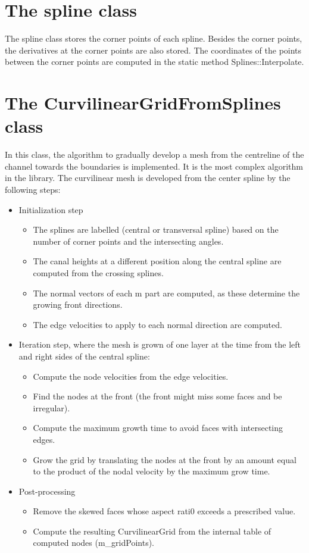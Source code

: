 \documentclass[biblatex]{deltares_manual}
\begin{document}
\chapter{The spline class}

The spline class stores the corner points of each spline. Besides the corner points, the derivatives at the corner points are also stored. The coordinates of the points between the corner points are computed in the static method Splines::Interpolate.
\chapter{The CurvilinearGridFromSplines class}

In this class, the algorithm to gradually develop a mesh from the centreline of the channel towards the boundaries is implemented. It is the most complex algorithm in the library. The curvilinear mesh is developed from the center spline by the following steps:
\begin{itemize}
\item Initialization step
\begin{itemize}
\item The splines are labelled (central or transversal spline) based on the number of corner points and the intersecting angles.
\item The canal heights at a different position along the central spline are computed from the crossing splines.
\item The normal vectors of each m part are computed, as these determine the growing front directions.
\item The edge velocities to apply to each normal direction are computed.
\end{itemize}
\item Iteration step, where the mesh is grown of one layer at the time from the left and right sides of the central spline:
\begin{itemize}
\item Compute the node velocities from the edge velocities.
\item Find the nodes at the front (the front might miss some faces and be irregular).
\item Compute the maximum growth time to avoid faces with intersecting edges.
\item Grow the grid by translating the nodes at the front by an amount equal to the product of the nodal velocity by the maximum grow time.
\end{itemize}
\item Post-processing
\begin{itemize}
\item Remove the skewed faces whose aspect rati0 exceeds a prescribed value.
\item Compute the resulting CurvilinearGrid from the internal table of computed nodes (m\_gridPoints).
\end{itemize}
\end{itemize}
\end{document}
